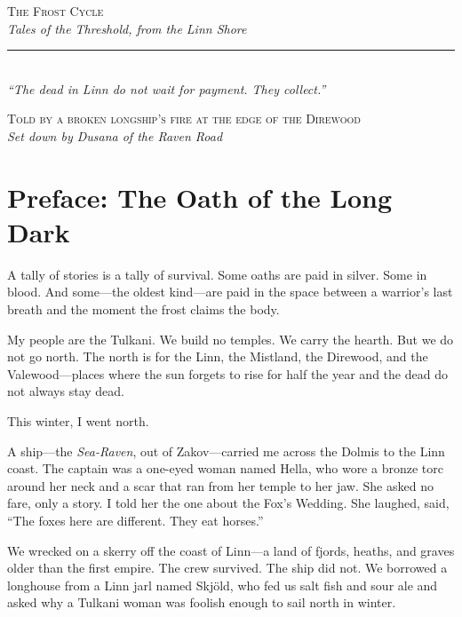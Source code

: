\documentclass[9pt,a5paper]{extbook}
\begin{document}


\frontmatter
\thispagestyle{empty}

\begin{center}
\vspace*{1.5cm}

{\LARGE\scshape\color{frostblue} The Frost Cycle}\\[0.8cm]

{\normalsize\itshape Tales of the Threshold, from the Linn Shore}\\[1.0cm]

\rule{0.5\textwidth}{1.0pt}\\[0.8cm]

{\small\textit{``The dead in Linn do not wait for payment. They collect.''}}\\[1.5cm]

\vfill

{\footnotesize\textsc{Told by a broken longship's fire at the edge of the Direwood}\\[0.2em]
\textit{Set down by Dusana of the Raven Road}}

\end{center}

\clearpage

\section*{Preface: The Oath of the Long Dark}

A tally of stories is a tally of survival. Some oaths are paid in silver. Some in blood. And some---the oldest kind---are paid in the space between a warrior's last breath and the moment the frost claims the body.

My people are the Tulkani. We build no temples. We carry the hearth. But we do not go north. The north is for the Linn, the Mistland, the Direwood, and the Valewood---places where the sun forgets to rise for half the year and the dead do not always stay dead.

This winter, I went north.

A ship---the \textit{Sea-Raven}, out of Zakov---carried me across the Dolmis to the Linn coast. The captain was a one-eyed woman named Hella, who wore a bronze torc around her neck and a scar that ran from her temple to her jaw. She asked no fare, only a story. I told her the one about the Fox's Wedding. She laughed, said, ``The foxes here are different. They eat horses.''

We wrecked on a skerry off the coast of Linn---a land of fjords, heaths, and graves older than the first empire. The crew survived. The ship did not. We borrowed a longhouse from a Linn jarl named Skjöld, who fed us salt fish and sour ale and asked why a Tulkani woman was foolish enough to sail north in winter.
\end{document}
